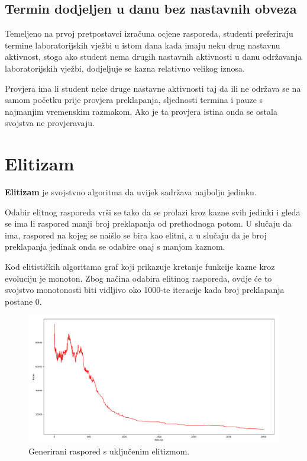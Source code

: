 \documentclass[times, utf8, zavrsni]{fer}
\begin{document}
\subsection{Termin dodjeljen u danu bez nastavnih obveza}

Temeljeno na prvoj pretpostavci izračuna ocjene rasporeda, studenti preferiraju termine laboratorijskih vježbi u istom dana kada imaju neku drug nastavnu aktivnost, stoga ako student nema drugih nastavnih aktivnosti u danu održavanja laboratorijskih vježbi, dodjeljuje se kazna relativno velikog iznosa.

Provjera ima li student neke druge nastavne aktivnosti taj da ili ne održava se na samom početku prije provjera preklapanja, sljednosti termina i pauze s najmanjim vremenskim razmakom. Ako je ta provjera istina onda se ostala svojstva ne provjeravaju.

\section{Elitizam}

\textbf{Elitizam}  je svojstvno algoritma da uvijek sadržava najbolju jedinku.

Odabir elitnog rasporeda vrši se tako da se prolazi kroz kazne svih jedinki i gleda se ima li raspored manji broj preklapanja od prethodnoga potom. U slučaju da ima, raspored na kojeg se naišlo se bira kao elitni, a u slučaju da je broj preklapanja jedinak onda se odabire onaj s manjom kaznom.

Kod elitističkih algoritama graf koji prikazuje kretanje funkcije kazne kroz evoluciju je monoton. Zbog načina odabira elitinog rasporeda, ovdje će to svojstvo monotonosti biti vidljivo oko 1000-te iteracije kada broj preklapanja postane 0.

\begin{figure}[htb]
\centering
\includegraphics[width=14cm]{images/elitizam_da.png}
\caption{Generirani raspored s uključenim elitizmom.}
\label{fig:elitiziam_da}
\end{figure}
\end{document}
